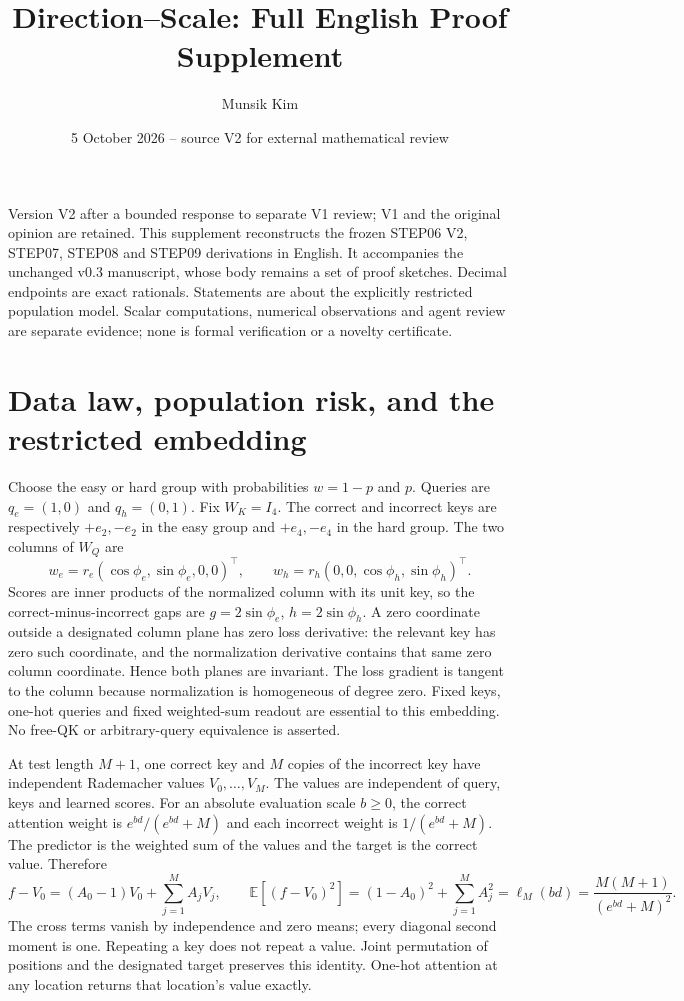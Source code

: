 \documentclass[11pt,a4paper]{article}
\title{Direction--Scale: Full English Proof Supplement}
\author{Munsik Kim}
\date{5 October 2026 -- source V2 for external mathematical review}
\begin{document}
\maketitle
\tableofcontents


Version V2 after a bounded response to separate V1 review; V1 and the original opinion are retained. This supplement reconstructs the frozen STEP06 V2, STEP07, STEP08 and STEP09 derivations in English. It accompanies the unchanged v0.3 manuscript, whose body remains a set of proof sketches. Decimal endpoints are exact rationals. Statements are about the explicitly restricted population model. Scalar computations, numerical observations and agent review are separate evidence; none is formal verification or a novelty certificate.

\section{Data law, population risk, and the restricted embedding}

Choose the easy or hard group with probabilities $w=1-p$ and $p$. Queries are $q_e=(1,0)$ and $q_h=(0,1)$. Fix $W_K=I_4$. The correct and incorrect keys are respectively $+e_2,-e_2$ in the easy group and $+e_4,-e_4$ in the hard group. The two columns of $W_Q$ are
\[
 w_e=r_e(\cos\phi_e,\sin\phi_e,0,0)^\top,\qquad
 w_h=r_h(0,0,\cos\phi_h,\sin\phi_h)^\top .
\]
Scores are inner products of the normalized column with its unit key, so the correct-minus-incorrect gaps are $g=2\sin\phi_e$, $h=2\sin\phi_h$. A zero coordinate outside a designated column plane has zero loss derivative: the relevant key has zero such coordinate, and the normalization derivative contains that same zero column coordinate. Hence both planes are invariant. The loss gradient is tangent to the column because normalization is homogeneous of degree zero. Fixed keys, one-hot queries and fixed weighted-sum readout are essential to this embedding. No free-QK or arbitrary-query equivalence is asserted.

At test length $M+1$, one correct key and $M$ copies of the incorrect key have independent Rademacher values $V_0,\ldots,V_M$. The values are independent of query, keys and learned scores. For an absolute evaluation scale $b\ge0$, the correct attention weight is $e^{bd}/(e^{bd}+M)$ and each incorrect weight is $1/(e^{bd}+M)$. The predictor is the weighted sum of the values and the target is the correct value. Therefore
\[
 f-V_0=(A_0-1)V_0+\sum_{j=1}^M A_jV_j,\qquad
 \mathbb E[(f-V_0)^2]=(1-A_0)^2+\sum_{j=1}^M A_j^2
 =\ell_M(bd)=\frac{M(M+1)}{(e^{bd}+M)^2}.
\]
The cross terms vanish by independence and zero means; every diagonal second moment is one. Repeating a key does not repeat a value. Joint permutation of positions and the designated target preserves this identity. One-hot attention at any location returns that location's value exactly.
\end{document}
